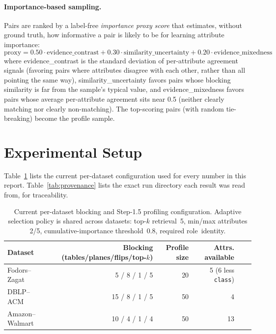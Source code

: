 \documentclass[11pt]{article}
\begin{document}
\paragraph{Importance-based sampling.} Pairs are ranked by a label-free
\emph{importance proxy score} that estimates, without ground truth, how
informative a pair is likely to be for learning attribute importance:
$$\text{proxy} = 0.50 \cdot \text{evidence\_contrast} + 0.30 \cdot \text{similarity\_uncertainty} + 0.20 \cdot \text{evidence\_mixedness}$$
%
where evidence\_contrast is the standard deviation of per-attribute agreement
signals (favoring pairs where attributes disagree with each other, rather than all
pointing the same way), similarity\_uncertainty favors pairs whose blocking
similarity is far from the sample's typical value, and evidence\_mixedness favors
pairs whose average per-attribute agreement sits near 0.5 (neither clearly matching
nor clearly non-matching). The top-scoring pairs (with random tie-breaking) become
the profile sample.

\section{Experimental Setup}
\label{sec:setup}

Table~\ref{tab:config} lists the current per-dataset configuration used for every
number in this report. Table~\ref{tab:provenance} lists the exact run directory each
result was read from, for traceability.

\begin{table}[htbp]
\centering
\small
\begin{tabular}{lrrrrr}
\toprule
Dataset & Blocking (tables/planes/flips/top-$k$) & Profile size & Attrs. available \\
\midrule
Fodors--Zagat   & 5 / 8 / 1 / 5  & 20 & 5 (6 less \texttt{class}) \\
DBLP--ACM       & 15 / 8 / 1 / 5 & 50 & 4 \\
Amazon--Walmart & 10 / 4 / 1 / 4 & 50 & 13 \\
\bottomrule
\end{tabular}
\caption{Current per-dataset blocking and Step-1.5 profiling configuration.
Adaptive selection policy is shared across datasets: top-$k$ retrieval~5, min/max
attributes 2/5, cumulative-importance threshold~0.8, required role~identity.}
\label{tab:config}
\end{table}
\end{document}
